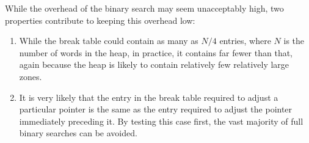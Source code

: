 While the overhead of the binary search may seem unacceptably high,
two properties contribute to keeping this overhead low:

\begin{enumerate}
\item While the break table could contain as many as $N/4$ entries,
  where $N$ is the number of words in the heap, in practice, it
  contains far fewer than that, again because the heap is likely to
  contain relatively few relatively large zones.
\item It is very likely that the entry in the break table required to
  adjust a particular pointer is the same as the entry required to
  adjust the pointer immediately preceding it.  By testing this case
  first, the vast majority of full binary searches can be avoided.
\end{enumerate}
